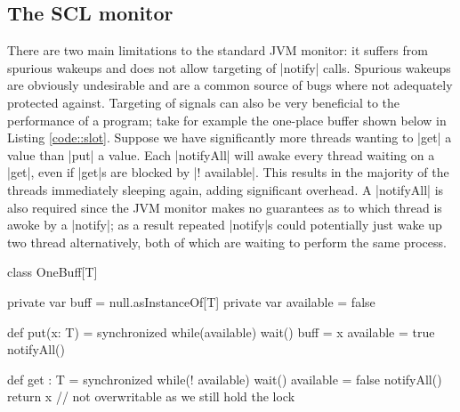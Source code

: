 \subsection{The SCL monitor}\label{section:SCLMonitor}
\inlineCSP

There are two main limitations to the standard JVM monitor: it suffers from spurious wakeups and does not allow targeting of |notify| calls. Spurious wakeups are obviously undesirable and are a common source of bugs where not adequately protected against. Targeting of signals can also be very beneficial to the performance of a program; take for example the one-place buffer shown below in Listing \ref{code::slot}. Suppose we have significantly more threads wanting to |get| a value than |put| a value. Each |notifyAll| will awake every thread waiting on a |get|, even if |get|s are blocked by |! available|. This results in the majority of the threads immediately sleeping again, adding significant overhead. A |notifyAll| is also required since the JVM monitor makes no guarantees as to which thread is awoke by a |notify|; as a result repeated |notify|s could potentially just wake up two thread alternatively, both of which are waiting to perform the same process.

\begin{scala}[label=code::slot, caption={Single placed buffer as an example of the inefficiency of untargeted signals}]
  class OneBuff[T] {
    private var buff = null.asInstanceOf[T]
    private var available = false

    def put(x: T) = synchronized {
      while(available) wait()
      buff = x
      available = true
      notifyAll()
    }

    def get : T = synchronized {
      while(! available) wait()
      available = false
      notifyAll()
      return x // not overwritable as we still hold the lock
    }
  }
\end{scala}

